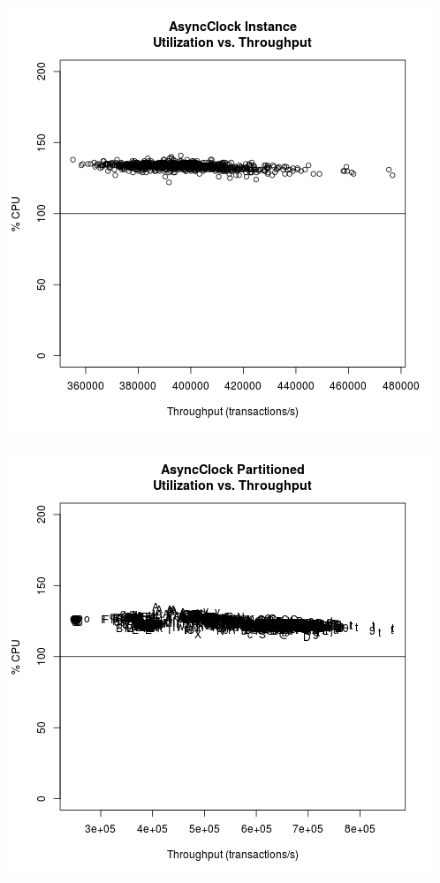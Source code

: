 \begin{figure}
\center
\includegraphics[height=.4\textheight]{async_instance_throughput_utilization.png}
\caption{\label{async_instance_throughput_utilization}}
\end{figure}

\begin{figure}
\center
\includegraphics[height=.4\textheight]{async_partitioned_throughput_utilization.png}
\caption{\label{async_partitioned_throughput_utilization}}
\end{figure}

